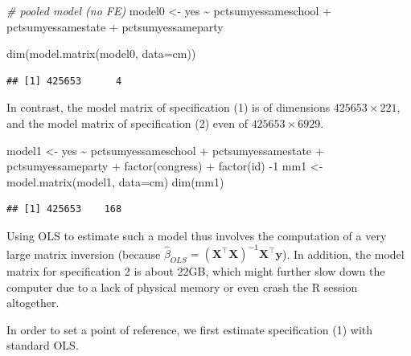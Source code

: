 \documentclass[
  12pt,
]{style/krantz}
\newenvironment{Shaded}{\begin{snugshade}}{\end{snugshade}}
\newcommand{\AttributeTok}[1]{\textcolor[rgb]{0.77,0.63,0.00}{#1}}
\newcommand{\CommentTok}[1]{\textcolor[rgb]{0.56,0.35,0.01}{\textit{#1}}}
\newcommand{\DecValTok}[1]{\textcolor[rgb]{0.00,0.00,0.81}{#1}}
\newcommand{\FunctionTok}[1]{\textcolor[rgb]{0.00,0.00,0.00}{#1}}
\newcommand{\NormalTok}[1]{#1}
\newcommand{\OtherTok}[1]{\textcolor[rgb]{0.56,0.35,0.01}{#1}}
\newcommand{\SpecialCharTok}[1]{\textcolor[rgb]{0.00,0.00,0.00}{#1}}
\begin{document}
\begin{Shaded}
\begin{Highlighting}[]
\CommentTok{\# pooled model (no FE)}
\NormalTok{model0 }\OtherTok{\textless{}{-}}\NormalTok{   yes }\SpecialCharTok{\textasciitilde{}} 
\NormalTok{  pctsumyessameschool }\SpecialCharTok{+} 
\NormalTok{  pctsumyessamestate }\SpecialCharTok{+} 
\NormalTok{  pctsumyessameparty }

\FunctionTok{dim}\NormalTok{(}\FunctionTok{model.matrix}\NormalTok{(model0, }\AttributeTok{data=}\NormalTok{cm))}
\end{Highlighting}
\end{Shaded}

\begin{verbatim}
## [1] 425653      4
\end{verbatim}

In contrast, the model matrix of specification (1) is of dimensions \(425653\times221\), and the model matrix of specification (2) even of \(425653\times6929\).

\begin{Shaded}
\begin{Highlighting}[]
\NormalTok{model1 }\OtherTok{\textless{}{-}} 
\NormalTok{  yes }\SpecialCharTok{\textasciitilde{}}\NormalTok{ pctsumyessameschool }\SpecialCharTok{+}\NormalTok{ pctsumyessamestate }\SpecialCharTok{+}\NormalTok{ pctsumyessameparty }\SpecialCharTok{+} 
  \FunctionTok{factor}\NormalTok{(congress) }\SpecialCharTok{+} \FunctionTok{factor}\NormalTok{(id) }\SpecialCharTok{{-}}\DecValTok{1}
\NormalTok{mm1 }\OtherTok{\textless{}{-}} \FunctionTok{model.matrix}\NormalTok{(model1, }\AttributeTok{data=}\NormalTok{cm)}
\FunctionTok{dim}\NormalTok{(mm1)}
\end{Highlighting}
\end{Shaded}

\begin{verbatim}
## [1] 425653    168
\end{verbatim}

Using OLS to estimate such a model thus involves the computation of a very large matrix inversion (because \(\hat{\beta}_{OLS} = (\mathbf{X}^\intercal\mathbf{X})^{-1}\mathbf{X}^{\intercal}\mathbf{y}\)). In addition, the model matrix for specification 2 is about 22GB, which might further slow down the computer due to a lack of physical memory or even crash the R session altogether.

In order to set a point of reference, we first estimate specification (1) with standard OLS.
\end{document}
